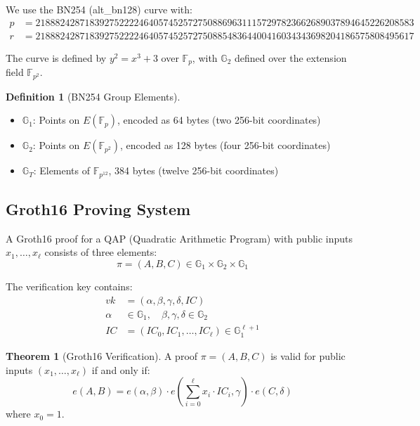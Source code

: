 \documentclass[11pt,a4paper]{article}
\theoremstyle{definition}
\newtheorem{definition}{Definition}
\newtheorem{theorem}{Theorem}
\begin{document}
We use the BN254 (alt\_bn128) curve with:
\begin{align}
    p &= 21888242871839275222246405745257275088696311157297823662689037894645226208583 \\
    r &= 21888242871839275222246405745257275088548364400416034343698204186575808495617
\end{align}

The curve is defined by $y^2 = x^3 + 3$ over $\mathbb{F}_p$, with $\mathbb{G}_2$ defined over the extension field $\mathbb{F}_{p^2}$.

\begin{definition}[BN254 Group Elements]
    \begin{itemize}
        \item $\mathbb{G}_1$: Points on $E(\mathbb{F}_p)$, encoded as 64 bytes (two 256-bit coordinates)
        \item $\mathbb{G}_2$: Points on $E(\mathbb{F}_{p^2})$, encoded as 128 bytes (four 256-bit coordinates)
        \item $\mathbb{G}_T$: Elements of $\mathbb{F}_{p^{12}}$, 384 bytes (twelve 256-bit coordinates)
    \end{itemize}
\end{definition}

\subsection{Groth16 Proving System}

A Groth16 proof for a QAP (Quadratic Arithmetic Program) with public inputs $x_1, \ldots, x_\ell$ consists of three elements:
\[
\pi = (A, B, C) \in \mathbb{G}_1 \times \mathbb{G}_2 \times \mathbb{G}_1
\]

The verification key contains:
\begin{align}
    vk &= (\alpha, \beta, \gamma, \delta, IC) \\
    \alpha &\in \mathbb{G}_1, \quad \beta, \gamma, \delta \in \mathbb{G}_2 \\
    IC &= (IC_0, IC_1, \ldots, IC_\ell) \in \mathbb{G}_1^{\ell+1}
\end{align}

\begin{theorem}[Groth16 Verification]
    A proof $\pi = (A, B, C)$ is valid for public inputs $(x_1, \ldots, x_\ell)$ if and only if:
    \[
    e(A, B) = e(\alpha, \beta) \cdot e\left(\sum_{i=0}^{\ell} x_i \cdot IC_i, \gamma\right) \cdot e(C, \delta)
    \]
    where $x_0 = 1$.
\end{theorem}
\end{document}

